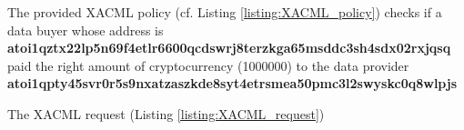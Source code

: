

The provided XACML policy (cf. Listing \ref{listing:XACML_policy}) checks if a data buyer whose address is 
\textbf{atoi1qztx22lp5n\-69f4etlr6600qcdswrj8terzkga65msddc3sh4sdx02rxjqsq}
paid the right amount of cryptocurrency (1000000) to the data provider \textbf{atoi1qpty45svr0r5s9nxatzas\-zkde8syt4etrsmea50pmc3l2swyskc0q8wlpjs}



The XACML request (Listing \ref{listing:XACML_request})

